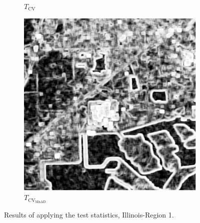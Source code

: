 \documentclass[aspectratio=1610,10pt]{beamer}
\begin{document}
\begin{frame}
\begin{figure}[H]
\begin{subfigure}[b]{0.3\textwidth}
    \caption{$T_\text{CV}$}
    \label{fig:test_lake-2}
  \end{subfigure}
  \hfill
  \begin{subfigure}[b]{0.3\textwidth}
    \centering
    \includegraphics[width=\textwidth]{../../Figures/PNG/mnad_lake_512}
    \caption{$T_{\text{CV}_{\text{MnAD}}}$}
    \label{fig:test_lake-3}
  \end{subfigure}
  \caption{Results of applying the test statistics, Illinois-Region 1.}
  \label{fig:test_lake}
\end{figure}
\end{frame} 
\end{document}

